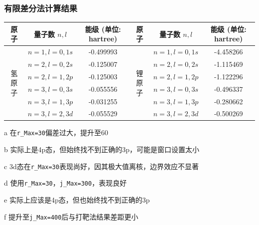 \subsubsection{有限差分法计算结果}
\begin{threeparttable}
    \begin{tabular}{|c|c|c|c|c|c|}
        \hline
        原子                   & 量子数 \(n, l\)     & 能级 (单位: hartree)   & 原子                   & 量子数 \(n, l\)     & 能级 (单位: hartree)   \\ \hline
        \multirow{6}{*}{氢原子} & \(n=1, l=0, 1s\) & -0.499993          & \multirow{6}{*}{锂原子} & \(n=1, l=0, 1s\) & -4.458266\tnote{d} \\ \cline{2-3} \cline{5-6}
                             & \(n=2, l=0, 2s\) & -0.125007          &                      & \(n=2, l=0, 2s\) & -1.115469          \\ \cline{2-3} \cline{5-6}
                             & \(n=2, l=1, 2p\) & -0.125003          &                      & \(n=2, l=1, 2p\) & -1.122296          \\ \cline{2-3} \cline{5-6}
                             & \(n=3, l=0, 3s\) & -0.055556\tnote{a} &                      & \(n=3, l=0, 3s\) & -0.496337          \\ \cline{2-3} \cline{5-6}
                             & \(n=3, l=1, 3p\) & -0.031255\tnote{b} &                      & \(n=3, l=1, 3p\) & -0.280662\tnote{e} \\ \cline{2-3} \cline{5-6}
                             & \(n=3, l=2, 3d\) & -0.055529\tnote{c} &                      & \(n=3, l=2, 3d\) & -0.500269\tnote{f} \\ \hline
    \end{tabular}
    \begin{tablenotes}
        \item[a] 在\texttt{r\_Max=30}偏差过大，提升至60
        \item[b] 实际上是4p态，但始终找不到正确的3p，可能是窗口设置太小
        \item[c] 3d态在\texttt{r\_Max=30}表现尚好，因其极大值离核，边界效应不显著
        \item[d] 使用\texttt{r\_Max=30}，\texttt{j\_Max=300}，表现良好 
        \item[e] 实际上应该是4p态，但也始终找不到正确的3p
        \item[f] 提升至\texttt{j\_Max=400}后与打靶法结果差距更小
    \end{tablenotes}
\end{threeparttable}


